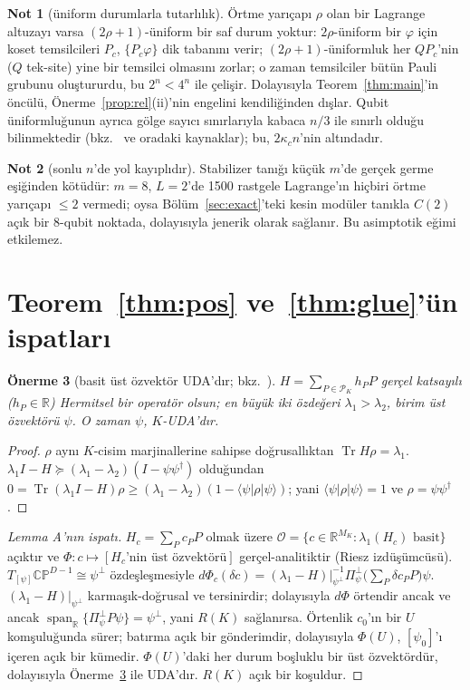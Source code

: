 \documentclass[aps,pra,onecolumn,superscriptaddress,nofootinbib,longbibliography,10pt]{revtex4-2}
\newtheorem{proposition}{Önerme}[section]
\theoremstyle{definition}
\newtheorem{remark}[proposition]{Not}
\newcommand{\RR}{\mathbb R}
\newcommand{\CP}{\mathbb{CP}}
\newcommand{\Tr}{\operatorname{Tr}}
\newcommand{\spanR}{\operatorname{span}_{\RR}}
\newcommand{\Pperp}{\Pi^{\perp}_{\psi}}
\newcommand{\kc}{\kappa_c}
\begin{document}
\begin{remark}[üniform durumlarla tutarlılık]
Örtme yarıçapı $\rho$ olan bir Lagrange altuzayı varsa $(2\rho+1)$-üniform bir saf durum yoktur: $2\rho$-üniform bir $\varphi$ için koset temsilcileri $P_c$, $\{P_c\varphi\}$ dik tabanını verir; $(2\rho+1)$-üniformluk her $QP_c$'nin ($Q$ tek-site) yine bir temsilci olmasını zorlar; o zaman temsilciler bütün Pauli grubunu oluştururdu, bu $2^n<4^n$ ile çelişir. Dolayısıyla Teorem~\ref{thm:main}'in öncülü, Önerme~\ref{prop:rel}(ii)'nin engelini kendiliğinden dışlar. Qubit üniformluğunun ayrıca gölge sayıcı sınırlarıyla kabaca $n/3$ ile sınırlı olduğu bilinmektedir (bkz.~\cite{Scott04} ve oradaki kaynaklar); bu, $2\kc n$'nin altındadır.
\end{remark}
\begin{remark}[sonlu $n$'de yol kayıplıdır]
Stabilizer tanığı küçük $m$'de gerçek germe eşiğinden kötüdür: $m=8$, $L=2$'de 1500 rastgele Lagrange'ın hiçbiri örtme yarıçapı $\le2$ vermedi; oysa Bölüm~\ref{sec:exact}'teki kesin modüler tanıkla $C(2)$ açık bir 8-qubit noktada, dolayısıyla jenerik olarak sağlanır. Bu asimptotik eğimi etkilemez.
\end{remark}

\section{Teorem~\ref{thm:pos} ve~\ref{thm:glue}'ün ispatları}\label{sec:proof2}

\begin{proposition}[basit üst özvektör UDA'dır; bkz.~\cite{CJWZ12,KJTV19}]\label{prop:top}
$H=\sum_{P\in\mathcal P_K}h_PP$ gerçel katsayılı ($h_P\in\RR$) Hermitsel bir operatör olsun; en büyük iki özdeğeri $\lambda_1>\lambda_2$, birim üst özvektörü $\psi$. O zaman $\psi$, $K$-UDA'dır.
\end{proposition}
\begin{proof}
$\rho$ aynı $K$-cisim marjinallerine sahipse doğrusallıktan $\Tr H\rho=\lambda_1$. $\lambda_1I-H\succeq(\lambda_1-\lambda_2)(I-\psi\psi^\dagger)$ olduğundan $0=\Tr(\lambda_1I-H)\rho\ge(\lambda_1-\lambda_2)(1-\langle\psi|\rho|\psi\rangle)$; yani $\langle\psi|\rho|\psi\rangle=1$ ve $\rho=\psi\psi^\dagger$.
\end{proof}

\begin{proof}[Lemma A'nın ispatı]
$H_c=\sum_Pc_PP$ olmak üzere $\mathcal O=\{c\in\RR^{M_K}:\lambda_1(H_c)\text{ basit}\}$ açıktır ve $\Phi:c\mapsto[H_c\text{'nin üst özvektörü}]$ gerçel-analitiktir (Riesz izdüşümcüsü). $T_{[\psi]}\CP^{D-1}\cong\psi^\perp$ özdeşleşmesiyle
$d\Phi_c(\delta c)=(\lambda_1-H)|_{\psi^\perp}^{-1}\Pperp\big(\sum_P\delta c_PP\big)\psi$.
$(\lambda_1-H)|_{\psi^\perp}$ karmaşık-doğrusal ve tersinirdir; dolayısıyla $d\Phi$ örtendir ancak ve ancak $\spanR\{\Pperp P\psi\}=\psi^\perp$, yani $R(K)$ sağlanırsa. Örtenlik $c_0$'ın bir $U$ komşuluğunda sürer; batırma açık bir gönderimdir, dolayısıyla $\Phi(U)$, $[\psi_0]$'ı içeren açık bir kümedir. $\Phi(U)$'daki her durum boşluklu bir üst özvektördür, dolayısıyla Önerme~\ref{prop:top} ile UDA'dır. $R(K)$ açık bir koşuldur.
\end{proof}
\end{document}
